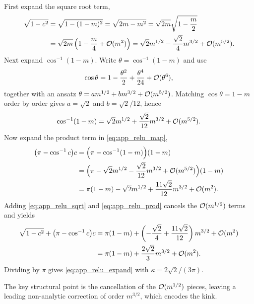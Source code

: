 \documentclass{article}
\theoremstyle{plain}
\theoremstyle{definition}
\theoremstyle{remark}
\begin{document}
First expand the square root term,
\relax
\begin{align}
\sqrt{1-c^{2}}&=\sqrt{1-(1-m)^2}=\sqrt{2m-m^{2}}=\sqrt{2m} \sqrt{1-\frac{m}{2}}\nonumber\\
&=\sqrt{2m}\left(1-\frac{m}{4}+{\cal O}(m^{2})\right)=\sqrt{2} m^{1/2}-\frac{\sqrt{2}}{4}m^{3/2}+{\cal O}(m^{5/2}).
\label{eq:app_relu_sqrt}
\end{align}
\relax
Next expand $\cos^{-1}(1-m)$. Write $\theta=\cos^{-1}(1-m)$ and use
\relax
\begin{align}
\cos\theta = 1-\frac{\theta^{2}}{2}+\frac{\theta^{4}}{24}+{\cal O}(\theta^{6}),
\label{eq:app_cos_series}
\end{align}
\relax
together with an ansatz $\theta=a m^{1/2}+b m^{3/2}+{\cal O}(m^{5/2})$. Matching
$\cos\theta=1-m$ order by order gives $a=\sqrt{2}$ and $b=\sqrt{2}/12$, hence
\relax
\begin{align}
\cos^{-1}(1-m) = \sqrt{2} m^{1/2}+\frac{\sqrt{2}}{12}m^{3/2}+{\cal O}(m^{5/2}).
\label{eq:app_relu_arccos}
\end{align}
\relax
Now expand the product term in \eqref{eq:app_relu_map},
\relax
\begin{align}
\bigl(\pi-\cos^{-1}c\bigr)c &= \Bigl(\pi-\cos^{-1}(1-m)\Bigr)(1-m)\nonumber\\
&= \Bigl(\pi-\sqrt{2} m^{1/2}-\frac{\sqrt{2}}{12}m^{3/2}+{\cal O}(m^{5/2})\Bigr)(1-m)\nonumber\\
&= \pi(1-m)-\sqrt{2} m^{1/2}+\frac{11\sqrt{2}}{12}m^{3/2}+{\cal O}(m^{2}).
\label{eq:app_relu_prod}
\end{align}
\relax
Adding \eqref{eq:app_relu_sqrt} and \eqref{eq:app_relu_prod} cancels the
${\cal O}(m^{1/2})$ terms and yields
\relax
\begin{align}
\sqrt{1-c^{2}}+\bigl(\pi-\cos^{-1}c\bigr)c &= \pi(1-m) + \left( -\frac{\sqrt{2}}{4}+\frac{11\sqrt{2}}{12} \right)m^{3/2} + {\cal O}(m^{2})\nonumber\\
&= \pi(1-m) +\frac{2\sqrt{2}}{3}m^{3/2} +{\cal O}(m^{2}).
\end{align}
\relax
Dividing by $\pi$ gives \eqref{eq:app_relu_expand} with $\kappa=2\sqrt{2}/(3\pi)$.

The key structural point is the cancellation of the ${\cal O}(m^{1/2})$ pieces, leaving a
leading non-analytic correction of order $m^{3/2}$, which encodes the kink.
\end{document}
